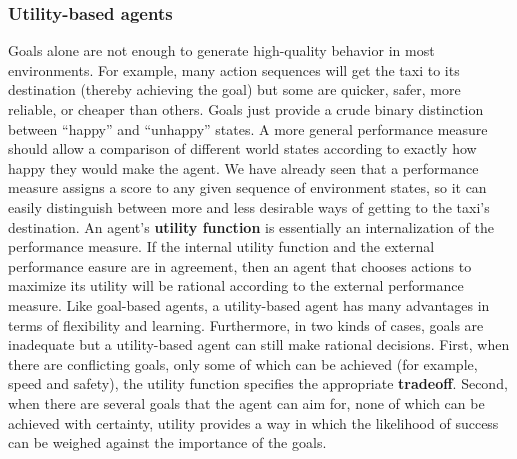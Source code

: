 \subsubsection{Utility-based agents}
Goals alone are not enough to generate high-quality behavior in most environments.  For example, many action sequences will get the taxi to its destination (thereby achieving the goal) but some are quicker, safer, more reliable, or cheaper than others.  Goals just provide a crude binary distinction between “happy” and “unhappy” states. A more general performance measure should allow a comparison of different world states according to exactly how happy
they would make the agent.\newline\newline
We have already seen that a performance measure assigns a score to any given sequence of environment states, so it can easily distinguish between more and less desirable ways of getting to the taxi’s destination.  An agent’s \textbf{utility function} is essentially an internalization of the performance measure. If the internal utility function and the external performance easure are in agreement, then an agent that chooses actions to maximize its utility will be rational according to the external performance measure.\newline\newline
Like goal-based agents, a utility-based agent has many advantages in
terms of flexibility and learning.\newline\newline
Furthermore, in two kinds of cases, goals are inadequate but
a utility-based agent can still make rational decisions. First, when there are conflicting goals, only some of which can be achieved (for example, speed and safety), the utility function specifies the appropriate \textbf{tradeoff}. Second, when there are several goals that the agent can aim for, none of which can be achieved with certainty, utility provides a way in which the likelihood of success can be weighed against the importance of the goals.

